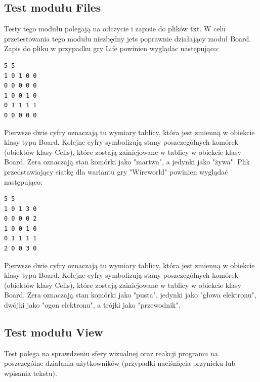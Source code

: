 \documentclass[10pt, oneside]{article}
\begin{document}
\subsection{Test modułu Files}
Testy tego modułu polegają na odczycie i zapisie do plików txt. W celu przetestowania tego modułu niezbędny jets poprawnie działający moduł Board. Zapis do pliku w przypadku gry Life powinien wyglądac następująco:
\begin {verbatim}
5 5 
1 0 1 0 0
0 0 0 0 0
1 0 0 1 0
0 1 1 1 1
0 0 0 0 0 
\end{verbatim}
Pierwsze dwie cyfry oznaczają tu wymiary tablicy, która jest zmienną w obiekcie klasy typu Board. Kolejne cyfry symbolizują stany poszczególnych komórek (obiektów klasy Cells), które zostają zainicjowane w tablicy w obiekcie klasy Board. Zera oznaczają stan komórki jako "martwa", a jedynki jako "żywa".
Plik przedstawiający siatkę dla wariantu gry "Wireworld" powinien wyglądać następująco:
\begin {verbatim}
5 5 
1 0 1 3 0
0 0 0 0 2
1 0 0 1 0
0 1 1 1 1
2 0 0 3 0 
\end{verbatim}
Pierwsze dwie cyfry oznaczają tu wymiary tablicy, która jest zmienną w obiekcie klasy typu Board. Kolejne cyfry symbolizują stany poszczególnych komórek (obiektów klasy Cells), które zostają zainicjowane w tablicy w obiekcie klasy Board. Zera oznaczają stan komórki jako "pusta",  jedynki jako "głowa elektronu", dwójki jako "ogon elektronu", a trójki jako "przewodnik".

\subsection {Test modułu View}
Test polega na sprawdzeniu sfery wizualnej oraz reakcji programu na poszczególne działania użytkowników (przypadki naciśnięcia przynicku lub wpisania tekstu).
\end{document}
